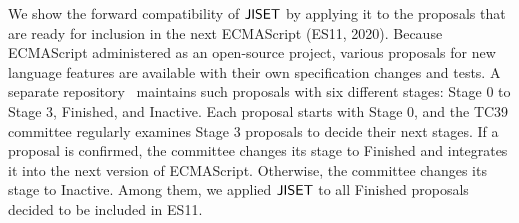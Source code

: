 We show the forward compatibility of \( \text{\sf JISET} \) by applying it to the proposals
that are ready for inclusion in the next ECMAScript (ES11, 2020). Because
ECMAScript administered as an open-source project, various proposals for new
language features are available with their own specification changes and tests.
A separate repository~\cite{proposals} maintains such proposals with six
different stages: Stage 0 to Stage 3, Finished, and Inactive.  Each proposal
starts with Stage 0, and the TC39 committee regularly examines Stage 3 proposals
to decide their next stages.  If a proposal is confirmed, the committee changes
its stage to Finished and integrates it into the next version of ECMAScript.
Otherwise, the committee changes its stage to Inactive.  Among them, we applied
\( \text{\sf JISET} \) to all Finished proposals decided to be included in ES11.

